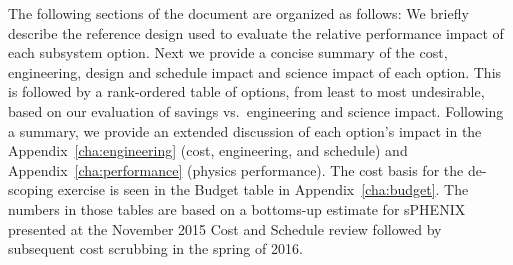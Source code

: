 The following sections of the document are organized as follows: We
briefly describe the reference design used to evaluate the relative
performance impact of each subsystem option. Next we provide a concise
summary of the cost, engineering, design and schedule impact and
science impact of each option. This is followed by a rank-ordered
table of options, from least to most undesirable, based on our
evaluation of savings vs.\ engineering and science impact. Following a
summary, we provide an extended discussion of each option's impact in
the Appendix~\ref{cha:engineering} (cost, engineering, and schedule)
and Appendix~\ref{cha:performance} (physics performance). The cost
basis for the de-scoping exercise is seen in the Budget table in
Appendix~\ref{cha:budget}. The numbers in those tables are based on a
bottoms-up estimate for sPHENIX presented at the November 2015 Cost
and Schedule review followed by subsequent cost scrubbing in the
spring of 2016.


